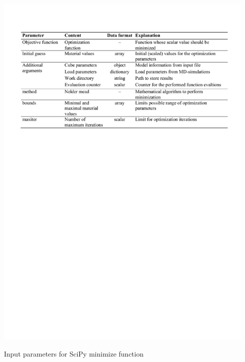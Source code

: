      \begin{table}[H]
		\centering
        \includegraphics[width=0.95\textwidth]{minimizeFuncitonInput.pdf}
		\caption{Input parameters for SciPy minimize function}
		\label{tab:minimizeFunctionInput}
	\end{table}

